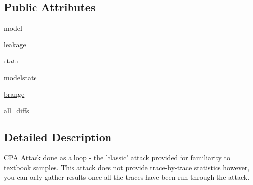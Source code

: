 \subsection*{Public Attributes}
\begin{DoxyCompactItemize}
\item 
\hyperlink{classsoftware_1_1chipwhisperer_1_1analyzer_1_1attacks_1_1cpa__algorithms_1_1simpleloop_1_1CPASimpleLoop_a450751e7ecb40c5131d3ccf548ccddcb}{model}
\item 
\hyperlink{classsoftware_1_1chipwhisperer_1_1analyzer_1_1attacks_1_1cpa__algorithms_1_1simpleloop_1_1CPASimpleLoop_aa7ac632a02f1219d1f023863a40ac29a}{leakage}
\item 
\hyperlink{classsoftware_1_1chipwhisperer_1_1analyzer_1_1attacks_1_1cpa__algorithms_1_1simpleloop_1_1CPASimpleLoop_a4b9c6b25dc19a66d34ef97e166ccd5ac}{stats}
\item 
\hyperlink{classsoftware_1_1chipwhisperer_1_1analyzer_1_1attacks_1_1cpa__algorithms_1_1simpleloop_1_1CPASimpleLoop_af6838053fcedfe40e2d7ef2966a9eae2}{modelstate}
\item 
\hyperlink{classsoftware_1_1chipwhisperer_1_1analyzer_1_1attacks_1_1cpa__algorithms_1_1simpleloop_1_1CPASimpleLoop_adcb6a59548d927dba0feb6d0d84445e1}{brange}
\item 
\hyperlink{classsoftware_1_1chipwhisperer_1_1analyzer_1_1attacks_1_1cpa__algorithms_1_1simpleloop_1_1CPASimpleLoop_aad757f965f4fbbf154628c2fd578da42}{all\+\_\+diffs}
\end{DoxyCompactItemize}


\subsection{Detailed Description}
\begin{DoxyVerb}CPA Attack done as a loop - the 'classic' attack provided for familiarity to textbook samples.
This attack does not provide trace-by-trace statistics however, you can only gather results once
all the traces have been run through the attack.
\end{DoxyVerb}
 

